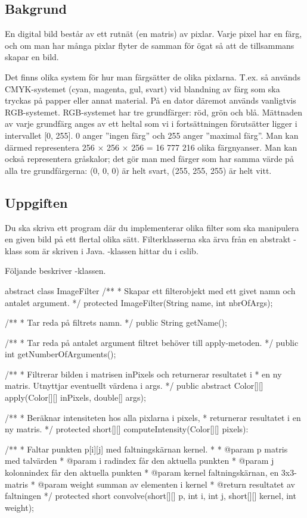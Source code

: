 

\subsection{Bakgrund}

En digital bild består av ett rutnät (en matris) av pixlar. Varje pixel har en färg, och om man har många pixlar flyter de samman för ögat så att de tillsammans skapar en bild.

Det finns olika system för hur man färgsätter de olika pixlarna. T.ex. så används CMYK-systemet (cyan, magenta, gul, svart) vid blandning av färg som ska tryckas på papper eller annat material. På en dator däremot används vanligtvis RGB-systemet. RGB-systemet har tre grundfärger: röd, grön och blå. Mättnaden av varje grundfärg anges av ett heltal som vi i fortsättningen förutsätter ligger i intervallet [0, 255]. 0 anger ”ingen färg” och 255 anger ”maximal färg”. Man kan därmed representera 256 × 256 × 256 = 16 777 216 olika färgnyanser. Man kan också representera gråskalor; det gör man med färger som har samma värde på alla tre grundfärgerna: (0, 0, 0) är helt svart, (255, 255, 255) är helt vitt.


\subsection{Uppgiften}
Du ska skriva ett program där du implementerar olika filter som ska manipulera en given bild på ett flertal olika sätt. Filterklasserna ska ärva från en abstrakt -klass som är skriven i Java. -klassen hittar du i cslib.

Följande beskriver -klassen.

\begin{JavaSpec}{abstract class ImageFilter}
/**
 * Skapar ett filterobjekt med ett givet namn och antalet argument.
 */
protected ImageFilter(String name, int nbrOfArgs);

/**
 * Tar reda på filtrets namn.
 */
public String getName();

/**
 * Tar reda på antalet argument filtret behöver till apply-metoden.
 */
public int getNumberOfArguments();

/**
 * Filtrerar bilden i matrisen inPixels och returnerar resultatet i 
 * en ny matris. Utnyttjar eventuellt värdena i args.
 */
public abstract Color[][] apply(Color[][] inPixels, double[] args);


/**
 * Beräknar intensiteten hos alla pixlarna i pixels,
 * returnerar resultatet i en ny matris.
 */
protected short[][] computeIntensity(Color[][] pixels):

/**
 * Faltar punkten p[i][j] med faltningskärnan kernel.
 * 
 * @param p 		matris med talvärden
 * @param i 		radindex får den aktuella punkten
 * @param j 		kolonnindex får den aktuella punkten
 * @param kernel	faltningskärnan, en 3x3-matris
 * @param weight	summan av elementen i kernel
 * @return 		resultatet av faltningen
 */
protected short convolve(short[][] p, int i, int j, 
			short[][] kernel, int weight);
\end{JavaSpec}

